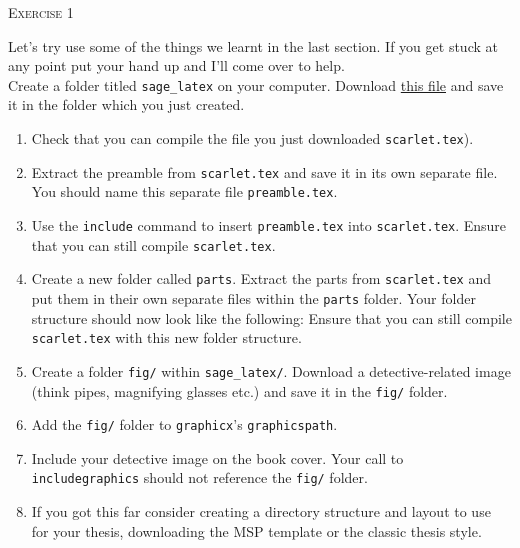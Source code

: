 \documentclass{article}
\begin{document}
\begin{center}
  \Large\textsc{Exercise 1}
\end{center}

Let's try use some of the things we learnt in the last section. If you
get stuck at any point put your hand up and I'll come over to help.\\

Create a folder titled \texttt{sage\_latex} on your computer. Download
\href{https://jwalton.info/assets/teaching/latex/scarlet.tex}{this file} 
and save it in the folder which you just created.

\begin{enumerate}
  \item Check that you can compile the file you just downloaded
    \texttt{scarlet.tex}).

  \item Extract the preamble from \texttt{scarlet.tex} and save it in its own
    separate file. You should name this separate file
    \texttt{preamble.tex}.

  \item Use the \texttt{\tb include} command to insert
    \texttt{preamble.tex} into \texttt{scarlet.tex}. Ensure that you can
    still compile \texttt{scarlet.tex}.

  \item{Create a new folder called \texttt{parts}. Extract the parts from 
    \texttt{scarlet.tex} and put them in their own separate files within
    the \texttt{parts} folder. Your folder structure should now look
    like the following:
    \vspace{0.25cm}
    Ensure that you can still compile \texttt{scarlet.tex} with this new 
    folder structure.}

  \item Create a folder \texttt{fig/} within \texttt{sage\_latex/}. Download a
    detective-related image (think pipes, magnifying glasses etc.) and
    save it in the \texttt{fig/} folder.

  \item Add the \texttt{fig/} folder to \texttt{graphicx}'s
    \texttt{graphicspath}.

  \item Include your detective image on the book cover. Your call to
    \texttt{\tb includegraphics} should not reference the
    \texttt{fig/} folder.
    
  \item If you got this far consider creating a directory structure and layout
    to use for your thesis, downloading the MSP template or the classic
    thesis style.
\end{enumerate}
\end{document}
